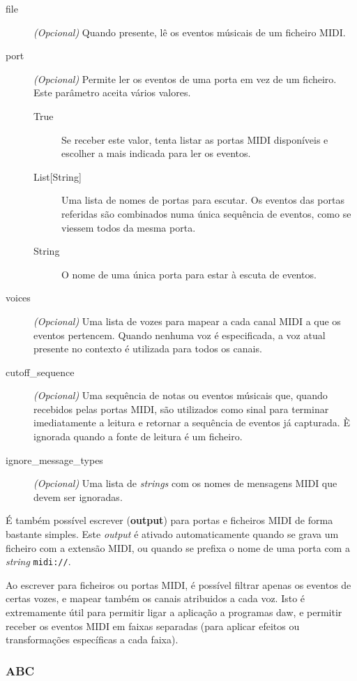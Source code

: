 \begin{description}
 \item[file] \textit{(Opcional)} Quando presente, lê os eventos músicais de um ficheiro MIDI.
 \item[port] \textit{(Opcional)} Permite ler os eventos de uma porta em vez de um ficheiro. Este parâmetro aceita vários valores.
 \begin{description}
  \item[True] Se receber este valor, tenta listar as portas MIDI disponíveis e escolher a mais indicada para ler os eventos.
  \item[List{[String]}] Uma lista de nomes de portas para escutar. Os eventos das portas referidas são combinados numa única sequência de eventos, como se viessem todos da mesma porta.
  \item[String] O nome de uma única porta para estar à escuta de eventos.
 \end{description}
 \item[voices] \textit{(Opcional)} Uma lista de vozes para mapear a cada canal MIDI a que os eventos pertencem. Quando nenhuma voz é especificada, a voz atual presente no contexto é utilizada para todos os canais.
 \item[cutoff\_sequence] \textit{(Opcional)} Uma sequência de notas ou eventos músicais que, quando recebidos pelas portas MIDI, são utilizados como sinal para terminar imediatamente a leitura e retornar a sequência de eventos já capturada. È ignorada quando a fonte de leitura é um ficheiro.
 \item[ignore\_message\_types] \textit{(Opcional)} Uma lista de \textit{strings} com os nomes de mensagens MIDI que devem ser ignoradas.
\end{description}

É também possível escrever (\textbf{output}) para portas e ficheiros MIDI de forma bastante simples. Este \textit{output} é ativado automaticamente quando se grava um ficheiro com a extensão MIDI, ou quando se prefixa o nome de uma porta com a \textit{string} \texttt{midi://}.

Ao escrever para ficheiros ou portas MIDI, é possível filtrar apenas os eventos de certas vozes, e mapear também os canais atribuidos a cada voz. Isto é extremamente útil para permitir ligar a aplicação a programas \acrshort{daw}, e permitir receber os eventos MIDI em faixas separadas (para aplicar efeitos ou transformações específicas a cada faixa).

\subsubsection{ABC}


